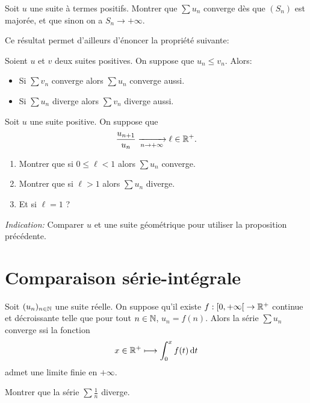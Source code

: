 \documentclass[../main.tex]{subfiles}
\begin{document}
\begin{exo}[M]
	Soit $u$ une suite à termes positifs. Montrer que $\sum u_n$ converge dès que $(S_n)$ est majorée, et que sinon on a $S_n \to +\infty$.
\end{exo}

Ce résultat permet d'ailleurs d'énoncer la propriété suivante:
\begin{prop}
	Soient $u$ et $v$ deux suites positives. On suppose que $u_n\leq v_n$. Alors:
	\begin{itemize}
		\item Si $\sum v_n$ converge alors $\sum u_n$ converge aussi.
		\item Si $\sum u_n$ diverge alors $\sum v_n$ diverge aussi.
	\end{itemize}
\end{prop}

\begin{exo}
	Soit $u$ une suite positive. On suppose que \[\frac{u_{n+1}}{u_n}\xrightarrow[n\to+\infty]{}\ell\in\mathbb R^+.\] \begin{enumerate}
		\item Montrer que si $0\leq\ell < 1$ alors $\sum u_n$ converge.
		\item Montrer que si $\ell>1$ alors $\sum u_n$ diverge.
		\item Et si $\ell=1$ ?
	\end{enumerate}
	\textit{Indication:} Comparer $u$ et une suite géométrique pour utiliser la proposition précédente.
\end{exo}

\section{Comparaison série-intégrale}

\begin{thm}
	Soit $(u_n)_{n\in\mathbb N}$ une suite réelle. On suppose qu'il existe $f:{[0,+\infty[}\rightarrow\mathbb R^+$ continue et décroissante telle que pour tout $n\in\mathbb N$, $u_n=f(n)$. Alors la série $\sum u_n$ converge ssi la fonction
	\[
	x\in\mathbb R^+\longmapsto \int_{0}^{x}f(t)\mathop{\mathrm{d}t}
	\]
	admet une limite finie en $+\infty$.
\end{thm}

\begin{exo}
	Montrer que la série $\sum \frac{1}{n}$ diverge.
\end{exo}
\end{document}
